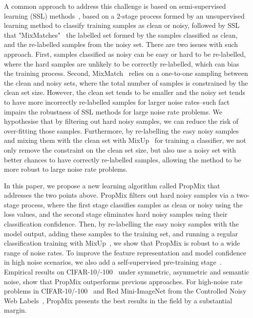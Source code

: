 \documentclass{bmvc2k}
\begin{document}
A common approach to address this challenge is based on semi-supervised learning (SSL) methods~\citep{ding2018semi,ortego2019towards,ortego2020multi,DivideMix}, based on a 2-stage process formed by an unsupervised learning method to classify training samples as clean or noisy, followed by SSL that "MixMatches"~\citep{MixMatch} the labelled set formed by the samples classified as clean, and the re-labelled samples from the noisy set.
There are two issues with such approach.  First, samples classified as noisy can be easy or hard to be re-labelled, where the hard samples are unlikely to be correctly re-labelled, which can bias the training process.
Second, MixMatch~\citep{MixMatch} relies on a one-to-one sampling between the clean and noisy sets, where the total number of samples is constrained by the clean set size. However, the clean set tends to be smaller and the noisy set tends to have more incorrectly re-labelled samples for larger noise rates--such fact impairs the robustness of SSL methods for large noise rate problems.
We hypothesise that by filtering out hard noisy samples, we can reduce the risk of over-fitting those samples.
Furthermore, by re-labelling the easy noisy samples and mixing them with the clean set with MixUp~\citep{mixup} for training a classifier, we not only remove the constraint on the clean set size, but also use a noisy set with better chances to have correctly re-labelled samples, allowing the method to be more robust to large noise rate problems. 

In this paper, we propose a new learning algorithm called PropMix that addresses the two points above. 
PropMix filters out hard noisy samples via a two-stage process, where the first stage classifies samples as clean or noisy using the loss values, and the second stage eliminates hard noisy samples using their classification confidence. 
Then, by re-labelling the easy noisy samples with the model output, adding these samples to the training set, and running a regular classification training with MixUp~\citep{mixup}, we  show that PropMix is robust to a wide range of noise rates.
To improve the feature representation and model confidence in high noise scenarios, we also add a self-supervised pre-training stage~\citep{MoCo,MoCoV2,SCAN,SimCLR}.
Empirical results on CIFAR-10/-100~\citep{krizhevsky2009learning} under symmetric, asymmetric and semantic 
noise, show that PropMix outperforms previous approaches. For high-noise rate problems in CIFAR-10/-100~\citep{DivideMix} and 
Red Mini-ImageNet from the Controlled Noisy Web Labels~\citep{FaMUS}, PropMix presents the best results in the field by a substantial margin.
\end{document}
